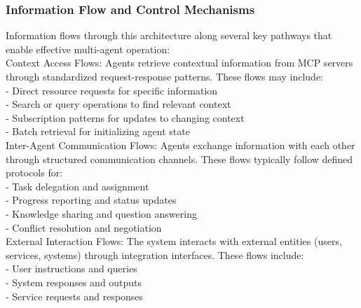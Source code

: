 \subsubsection{Information Flow and Control Mechanisms}
Information flows through this architecture along several key pathways that enable effective multi-agent operation:\\ \newline
Context Access Flows: Agents retrieve contextual information from MCP servers through standardized request-response patterns. These flows may include:\\ \newline
- Direct resource requests for specific information\\ \newline
- Search or query operations to find relevant context\\ \newline
- Subscription patterns for updates to changing context\\ \newline
- Batch retrieval for initializing agent state\\ \newline
Inter-Agent Communication Flows: Agents exchange information with each other through structured communication channels. These flows typically follow defined protocols for:\\ \newline
- Task delegation and assignment\\ \newline
- Progress reporting and status updates\\ \newline
- Knowledge sharing and question answering\\ \newline
- Conflict resolution and negotiation\\ \newline
External Interaction Flows: The system interacts with external entities (users, services, systems) through integration interfaces. These flows include:\\ \newline
- User instructions and queries\\ \newline
- System responses and outputs\\ \newline
- Service requests and responses\\ \newline
